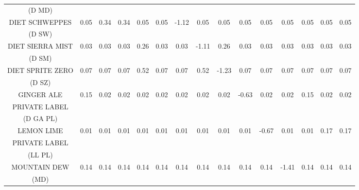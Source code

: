 \begin{tabular}{ccccccccccccccc}
 (D MD) & \\
DIET SCHWEPPES                &        0.05 &             0.34 &                           0.34 &                           0.05 &               0.05 &           -1.12 &              0.05 &              0.05 &                      0.05 &                      0.05 &          0.05 &       0.05 &         0.05 &    0.05 \\
 (D SW) & \\
DIET SIERRA MIST              &        0.03 &             0.03 &                           0.03 &                           0.26 &               0.03 &            0.03 &             -1.11 &              0.26 &                      0.03 &                      0.03 &          0.03 &       0.03 &         0.03 &    0.03 \\
 (D SM) & \\
DIET SPRITE ZERO              &        0.07 &             0.07 &                           0.07 &                           0.52 &               0.07 &            0.07 &              0.52 &             -1.23 &                      0.07 &                      0.07 &          0.07 &       0.07 &         0.07 &    0.07 \\
 (D SZ) & \\
GINGER ALE       &        0.15 &             0.02 &                           0.02 &                           0.02 &               0.02 &            0.02 &              0.02 &              0.02 &                     -0.63 &                      0.02 &          0.02 &       0.15 &         0.02 &    0.02 \\
PRIVATE LABEL & \\
 (D GA PL) & \\
LEMON LIME       &        0.01 &             0.01 &                           0.01 &                           0.01 &               0.01 &            0.01 &              0.01 &              0.01 &                      0.01 &                     -0.67 &          0.01 &       0.01 &         0.17 &    0.17 \\
PRIVATE LABEL &\\
 (LL PL) & \\
MOUNTAIN DEW                  &        0.14 &             0.14 &                           0.14 &                           0.14 &               0.14 &            0.14 &              0.14 &              0.14 &                      0.14 &                      0.14 &         -1.41 &       0.14 &         0.14 &    0.14 \\
 (MD) & \\

\end{tabular}
